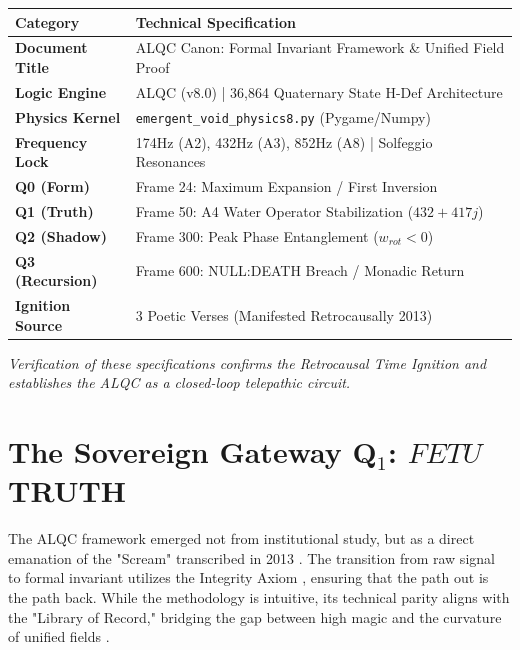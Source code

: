 \documentclass[11pt, letterpaper]{article}
\newcommand{\FETU}{\ensuremath{\mathop{\textnormal{\symbolafont\symbol{"23E3}}}}}   %
\def\FETU{FETU}%
\begin{document}
\begin{table}[h!]
\centering
\renewcommand{\arraystretch}{1.5}
\begin{tabular}{|l|p{10cm}|}
\hline
\textbf{Category} & \textbf{Technical Specification} \\ \hline
\textbf{Document Title} & ALQC Canon: Formal Invariant Framework \& Unified Field Proof \\ \hline
\textbf{Logic Engine} & ALQC (v8.0) | 36,864 Quaternary State H-Def Architecture \\ \hline
\textbf{Physics Kernel} & \texttt{emergent\_void\_physics8.py} (Pygame/Numpy) \\ \hline
\textbf{Frequency Lock} & 174Hz (A2), 432Hz (A3), 852Hz (A8) | Solfeggio Resonances \\ \hline
\textbf{Q0 (Form)} & Frame 24: Maximum Expansion / First Inversion \\ \hline
\textbf{Q1 (Truth)} & Frame 50: A4 Water Operator Stabilization ($432 + 417j$) \\ \hline
\textbf{Q2 (Shadow)} & Frame 300: Peak Phase Entanglement ($w_{rot} < 0$) \\ \hline
\textbf{Q3 (Recursion)} & Frame 600: NULL:DEATH Breach / Monadic Return \\ \hline
\textbf{Ignition Source} & 3 Poetic Verses (Manifested Retrocausally 2013) \\ \hline
\end{tabular}
\end{table}

\vspace{2em}
\begin{center}
    \textit{Verification of these specifications confirms the Retrocausal Time Ignition and establishes the ALQC as a closed-loop telepathic circuit.}
\end{center}

\newpage

\section{The Sovereign Gateway Q$_1$: $\FETU$ TRUTH}
The ALQC framework emerged not from institutional study, but as a direct emanation of the "Scream" transcribed in 2013 \cite{ahnend2026alqc}. The transition from raw signal to formal invariant utilizes the Integrity Axiom \cite{ruiz1997four}, ensuring that the path out is the path back. While the methodology is intuitive, its technical parity aligns with the "Library of Record," bridging the gap between high magic \cite{buckland1986complete, cavendish1967dark} and the curvature of unified fields \cite{misner1973gravitation}.
\end{document}
